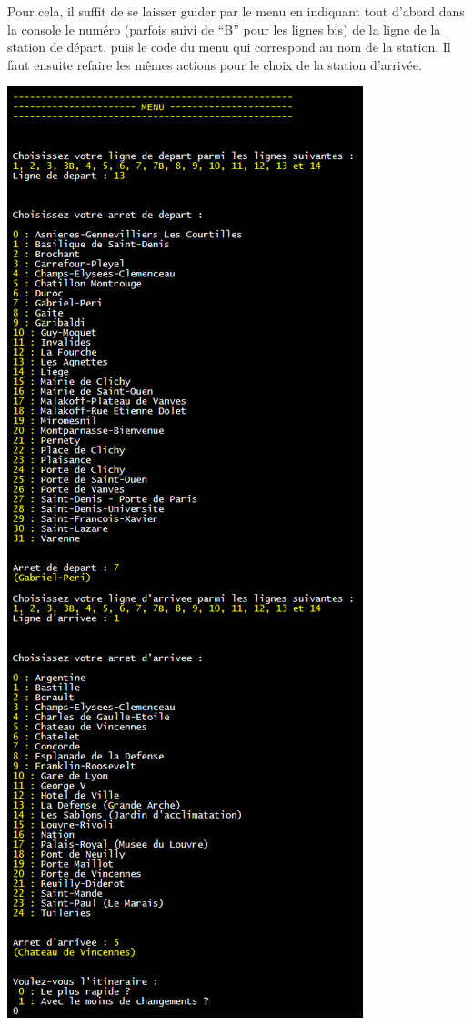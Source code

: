 \documentclass[,french]{article}
\begin{document}
Pour cela, il suffit de se laisser guider par le menu en indiquant tout
d'abord dans la console le numéro (parfois suivi de ``B'' pour les
lignes bis) de la ligne de la station de départ, puis le code du menu
qui correspond au nom de la station. Il faut ensuite refaire les mêmes
actions pour le choix de la station d'arrivée.

\includegraphics{img/menu/menu12.png}
\end{document}
